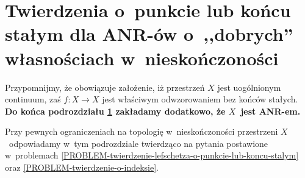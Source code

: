 


\section[Twierdzenia o~punkcie lub końcu stałym dla ANR-ów]{Twierdzenia o~punkcie lub końcu stałym dla ANR-ów o~,,dobrych'' własnościach w~nieskończoności}\label{sec-lef_osw_kon}

Przypomnijmy, że obowiązuje założenie, iż przestrzeń $X$ jest uogólnionym continuum, zaś $f\colon X\to X$ jest właściwym odwzorowaniem bez końców stałych. \textbf{Do końca podrozdziału \ref{sec-lef_osw_kon} zakładamy dodatkowo, że $X$~jest \mbox{ANR-em}.}

Przy pewnych ograniczeniach na topologię w~nieskończoności przestrzeni $X$~odpowiadamy w~tym podrozdziale twierdząco na pytania postawione w~problemach \ref{PROBLEM-twierdzenie-lefschetza-o-punkcie-lub-koncu-stalym} oraz \ref{PROBLEM-twierdzenie-o-indeksie}.




